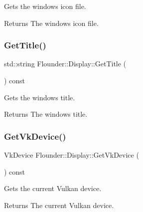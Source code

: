 Gets the window\textquotesingle{}s icon file. 

\begin{DoxyReturn}{Returns}
The window\textquotesingle{}s icon file. 
\end{DoxyReturn}
\mbox{\label{class_flounder_1_1_display_a99246ee0817aa140129817df3687ca06}} 
\subsubsection{\texorpdfstring{Get\+Title()}{GetTitle()}}
{\footnotesize\ttfamily std\+::string Flounder\+::\+Display\+::\+Get\+Title (\begin{DoxyParamCaption}{ }\end{DoxyParamCaption}) const\hspace{0.3cm}{\ttfamily [inline]}}



Gets the window\textquotesingle{}s title. 

\begin{DoxyReturn}{Returns}
The window\textquotesingle{}s title. 
\end{DoxyReturn}
\mbox{\label{class_flounder_1_1_display_ac149030bd842db3be3337a9488d83bf4}} 
\subsubsection{\texorpdfstring{Get\+Vk\+Device()}{GetVkDevice()}}
{\footnotesize\ttfamily Vk\+Device Flounder\+::\+Display\+::\+Get\+Vk\+Device (\begin{DoxyParamCaption}{ }\end{DoxyParamCaption}) const\hspace{0.3cm}{\ttfamily [inline]}}



Gets the current Vulkan device. 

\begin{DoxyReturn}{Returns}
The current Vulkan device. 
\end{DoxyReturn}
\mbox{\label{class_flounder_1_1_display_aefd86e2034619b11db19bf7f3703399a}} 
